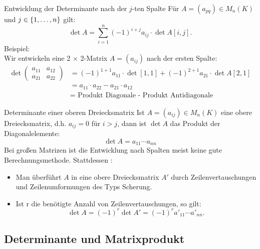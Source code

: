 \documentclass[main.tex]{subfiles}
\begin{document}
\begin{karte}{Entwicklung der Determinante nach der \(j\)-ten Spalte}
    Für \(A = (a_{pq}) \in M_n(K)\) und \(j \in \{1, \ldots ,n\}\) gilt:
    \[\det A = \sum_{i=1}^n(-1)^{i+j}a_{ij} \cdot \det A[i,j].\]
    Beispiel: \\
    Wir entwickeln eine 2 \(\times\) 2-Matrix \(A = (a_{ij})\) nach der
    ersten Spalte: 
    \[ \begin{split}
        \det 
        \begin{pmatrix}
        a_{11} & a_{12} \\
        a_{21} & a_{22}    
         \end{pmatrix} 
    & = (-1)^{1+1}a_{11} \cdot \det [1,1] + (-1)^{2+1}a_{21} \cdot \det A[2,1] \\
    & = a_{11} \cdot a_{22} - a_{21} \cdot a_{12}\\
    & = \text{ Produkt Diagonale - Produkt Antidiagonale}
    \end{split} 
    \]
\end{karte}
\begin{karte}{Determinante einer oberen Dreiecksmatrix} 
    Ist \(A = (a_{ij}) \in M_n(K)\) eine obere Dreiecksmatrix, d.h.
    \(a_{ij} = 0\) für \(i > j\), dann ist \(\det A\) das Produkt der 
    Diagonalelemente: 
    \[\det A = a_{11} \cdots a_{nn}\]
    Bei großen Matrizen ist die Entwicklung nach Spalten meist keine 
    gute Berechnungsmethode. Stattdessen : 
    \begin{itemize}
       \item Man überführt \(A\) in  eine obere Dreiecksmatrix 
       \(A'\) durch Zeilenvertauschungen und Zeilenumformungen des 
       Typs Scherung.
       \item Ist r die benötigte Anzahl von Zeilenvertauschungen, so gilt:
       \[\det A = (-1)^r \det A' = (-1)^r a'_{11} \cdots a'_{nn} .\]
    \end{itemize}
\end{karte}

\subsection*{Determinante und Matrixprodukt}
\end{document}
